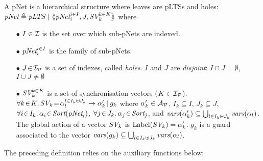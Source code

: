 \documentclass{llncs}
\begin{document}
\begin{definition}[pNets]\label{def-pnets}
A pNet is a hierarchical structure where leaves are pLTSs and holes:\\
$\pNet\triangleq \pLTS~|~\mylangle \pNet_i^{i\in I}, J, \symb{SV}_k^{k\in 
K}\myrangle$
where
\begin{itemize}
\item[$\bullet$] $I \in \I$ is the set over which sub-pNets are indexed.
\item[$\bullet$] $\pNet_i^{i\in I}$ is the family of sub-pNets.

\item[$\bullet$] $J\!\in\!\I_\P$ is a set of indexes, called \emph{holes}.
$I$ and $J$ are \emph{disjoint}: $I\!\cap\! J=\emptyset$,  $I\!\cup\! J\neq\emptyset$

\item[$\bullet$] $\symb{SV}_k^{k\in K}$ is a set of
  synchronisation vectors ($K\in\I_\P$). $\forall k\!\in\! K,
  \symb{SV}_k\!=\!\alpha_{l}^{l\in I_k \uplus J_k}\to\alpha'_k\,|\,g_k$ where
  $\alpha'_k\in \mathcal{A}_\P$, $I_k\subseteq I$, $J_k\subseteq J$,
  $\forall i\!\in\!
  I_k.\,\alpha_{i}\!\in\!\Sort(\pNet_i)$,  $\forall j\!\in\!
  J_k.\,\alpha_{j}\!\in\!\Sort_j$, and $\vars(\alpha'_k)\subseteq \bigcup_{l\in I_k\uplus 
  J_k}{\vars({\alpha_l})}$. The global action of a vector $\symb{SV}_k$ is
$\Label(\symb{SV}_k) = \alpha'_k$. $g_k $ is a guard associated to the vector 
$\vars(g_k)\subseteq \bigcup_{l\in I_k\uplus J_k}{\vars({\alpha_l})}$.


\end{itemize}
\end{definition}

The preceding definition relies on the auxiliary functions below:
\end{document}
